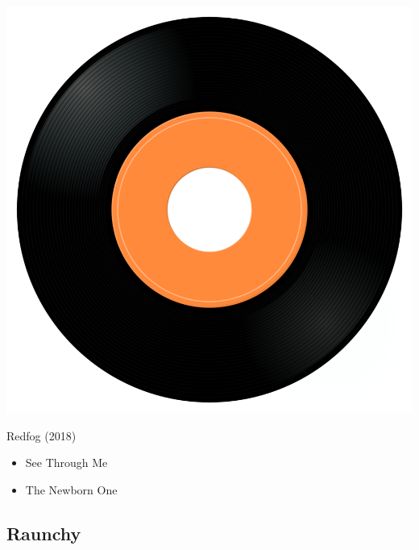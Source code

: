 \begin{minipage}[t]{0.25\textwidth}\vspace{0pt}
\captionsetup{type=figure}
\includegraphics[width=\textwidth]{Images/cover.png}
\caption*{Redfog (2018)}
\end{minipage}
\begin{minipage}[t]{0.25\textwidth}\vspace{0pt}
\begin{itemize}[nosep,leftmargin=1em,labelwidth=*,align=left]
	\setlength{\itemsep}{0pt}
	\item See Through Me
	\item The Newborn One
\end{itemize}
\end{minipage}

\subsection{Raunchy}

